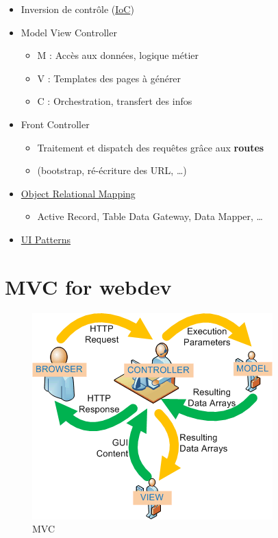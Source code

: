 \begin{itemize}
\tightlist
\item
  Inversion de contrôle
  (\href{http://martinfowler.com/bliki/InversionOfControl.html}{IoC})
\item
  Model View Controller

  \begin{itemize}
  \tightlist
  \item
    M : Accès aux données, logique métier
  \item
    V : Templates des pages à générer
  \item
    C : Orchestration, transfert des infos
  \end{itemize}
\item
  Front Controller

  \begin{itemize}
  \tightlist
  \item
    Traitement et dispatch des requêtes grâce aux \textbf{routes}
  \item
    (bootstrap, ré-écriture des URL, \ldots)
  \end{itemize}
\item
  \href{https://web.archive.org/web/20160316065751/http://blog.mazenod.fr/2010/01/design-pattern-mvc-zoom-sur-la-couche-modele-dal-dao-orm-crud/}{Object
  Relational Mapping}

  \begin{itemize}
  \tightlist
  \item
    Active Record, Table Data Gateway, Data Mapper, \ldots{}
  \end{itemize}
\item
  \href{http://ui-patterns.com/}{UI Patterns}
\end{itemize}

\hypertarget{mvc-for-webdev}{%
\section{MVC for webdev}\label{mvc-for-webdev}}

\begin{figure}
\centering
\includegraphics{src/img/mvc.png}
\caption{MVC}
\end{figure}


